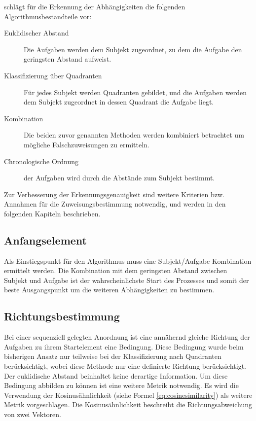 \citet{max} schlägt für die Erkennung der Abhängigkeiten die folgenden Algorithmusbestandteile vor:
\begin{description}
	\item[Euklidischer Abstand] Die Aufgaben werden dem Subjekt zugeordnet, zu dem die Aufgabe den geringsten Abstand aufweist.
	\item[Klassifizierung über Quadranten] Für jedes Subjekt werden Quadranten gebildet, und die Aufgaben werden dem Subjekt zugeordnet in dessen Quadrant die Aufgabe liegt.
	\item[Kombination] Die beiden zuvor genannten Methoden werden kombiniert betrachtet um mögliche Falschzuweisungen zu ermitteln.
	\item[Chronologische Ordnung] der Aufgaben wird durch die Abstände zum Subjekt bestimmt.
\end{description}

Zur Verbesserung der Erkennungsgenauigkeit sind weitere Kriterien bzw. Annahmen für die Zuweisungsbestimmung notwendig, und werden in den folgenden Kapiteln beschrieben.

\subsection{Anfangselement} %
\label{sub:anfangselement}
Als Einstiegspunkt für den Algorithmus muss eine Subjekt/Aufgabe Kombination ermittelt werden. Die Kombination mit dem geringsten Abstand zwischen Subjekt und Aufgabe ist der wahrscheinlichste Start des Prozesses und somit der beste Ausgangspunkt um die weiteren Abhängigkeiten zu bestimmen. 
\subsection{Richtungsbestimmung} %
\label{sub:richtungsbestimmung}
Bei einer sequenziell gelegten Anordnung ist eine annähernd gleiche Richtung der Aufgaben zu ihrem Startelement eine Bedingung. Diese Bedingung wurde beim bisherigen Ansatz nur teilweise bei der Klassifizierung nach Quadranten berücksichtigt, wobei diese Methode nur eine definierte Richtung berücksichtigt. Der euklidische Abstand beinhaltet keine derartige Information. Um diese Bedingung abbilden zu können ist eine weitere Metrik notwendig. Es wird die Verwendung der Kosinusähnlichkeit (siehe Formel  \ref{eq:cosinesimilarity}) als weitere Metrik vorgeschlagen. Die Kosinusähnlichkeit beschreibt die Richtungsabweichung von zwei Vektoren.


